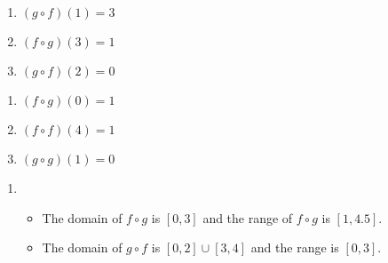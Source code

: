 \begin{multicols}{3}
\begin{enumerate}
\setcounter{enumi}{\value{HW}}

\item  $(g\circ f)(1) = 3$ 
\item  $(f \circ g)(3) = 1$
\item  $(g\circ f)(2) = 0$
\setcounter{HW}{\value{enumi}}
\end{enumerate}
\end{multicols}

\begin{multicols}{3}
\begin{enumerate}
\setcounter{enumi}{\value{HW}}
\item  $(f\circ g)(0) = 1$  
\item  $(f\circ f)(4) = 1$
\item  $(g \circ g)(1) = 0$

\setcounter{HW}{\value{enumi}}
\end{enumerate}
\end{multicols}

\begin{enumerate}
\setcounter{enumi}{\value{HW}}

\item  \begin{itemize} \item The domain of $f \circ g$ is $[0,3]$ and the range of $f \circ g$ is $[1, 4.5]$.
\item The domain of $g \circ f$ is $[0,2] \cup [3,4]$ and the range is $[0,3]$.

\end{itemize}

\setcounter{HW}{\value{enumi}}
\end{enumerate}

